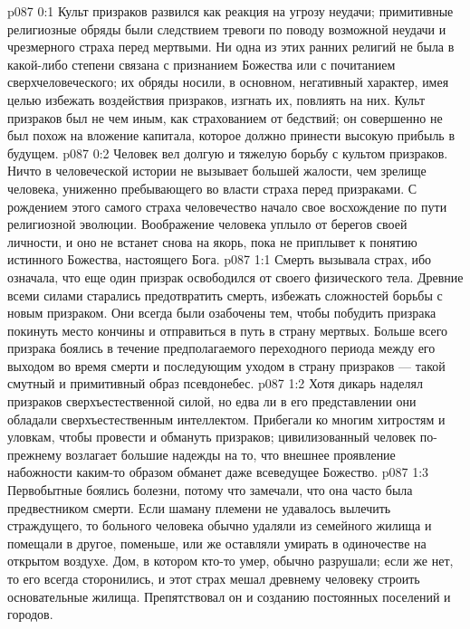 \author{Блестящая Вечерняя Звезда}
\vs p087 0:1 Культ призраков развился как реакция на угрозу неудачи; примитивные религиозные обряды были следствием тревоги по поводу возможной неудачи и чрезмерного страха перед мертвыми. Ни одна из этих ранних религий не была в какой\hyp{}либо степени связана с признанием Божества или с почитанием сверхчеловеческого; их обряды носили, в основном, негативный характер, имея целью избежать воздействия призраков, изгнать их, повлиять на них. Культ призраков был не чем иным, как страхованием от бедствий; он совершенно не был похож на вложение капитала, которое должно принести высокую прибыль в будущем.
\vs p087 0:2 Человек вел долгую и тяжелую борьбу с культом призраков. Ничто в человеческой истории не вызывает большей жалости, чем зрелище человека, униженно пребывающего во власти страха перед призраками. С рождением этого самого страха человечество начало свое восхождение по пути религиозной эволюции. Воображение человека уплыло от берегов своей личности, и оно не встанет снова на якорь, пока не приплывет к понятию истинного Божества, настоящего Бога.
\vs p087 1:1 Смерть вызывала страх, ибо означала, что еще один призрак освободился от своего физического тела. Древние всеми силами старались предотвратить смерть, избежать сложностей борьбы с новым призраком. Они всегда были озабочены тем, чтобы побудить призрака покинуть место кончины и отправиться в путь в страну мертвых. Больше всего призрака боялись в течение предполагаемого переходного периода между его выходом во время смерти и последующим уходом в страну призраков --- такой смутный и примитивный образ псевдонебес.
\vs p087 1:2 Хотя дикарь наделял призраков сверхъестественной силой, но едва ли в его представлении они обладали сверхъестественным интеллектом. Прибегали ко многим хитростям и уловкам, чтобы провести и обмануть призраков; цивилизованный человек по\hyp{}прежнему возлагает большие надежды на то, что внешнее проявление набожности каким\hyp{}то образом обманет даже всеведущее Божество.
\vs p087 1:3 Первобытные боялись болезни, потому что замечали, что она часто была предвестником смерти. Если шаману племени не удавалось вылечить страждущего, то больного человека обычно удаляли из семейного жилища и помещали в другое, поменьше, или же оставляли умирать в одиночестве на открытом воздухе. Дом, в котором кто\hyp{}то умер, обычно разрушали; если же нет, то его всегда сторонились, и этот страх мешал древнему человеку строить основательные жилища. Препятствовал он и созданию постоянных поселений и городов.
